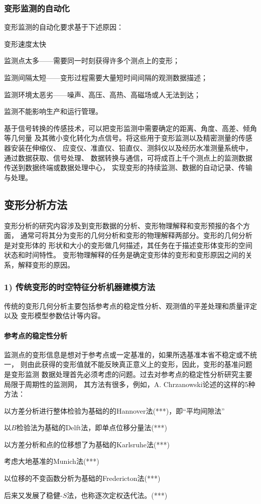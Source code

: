 \subsubsection*{变形监测的自动化}
变形监测的自动化要求基于下述原因：
\begin{asparaitem}[$\bullet$]
\item 变形速度太快
\item 监测点太多——需要同一时刻获得许多个测点上的变形；
\item 监测间隔太短——变形过程需要大量短时间间隔的观测数据描述；
\item 监测环境太恶劣——噪声、高压、高热、高磁场或人无法到达；
\item 监测不能影响生产和运行管理。
\end{asparaitem}
基于信号转换的传感技术，可以把变形监测中需要确定的距离、角度、高差、倾角等几何量
及其微小变化转化为点信号。将这些用于变形监测以及精密测量的传感器安装在伸缩仪、
应变仪、准直仪、铅直仪、测斜仪以及经历水准测量系统中，通过数据获取、信号处理、
数据转换与通信，可将成百上千个测点上的监测数据传送到数据终端或数据处理中心，
实现变形的持续监测、数据的自动记录、传输与处理。

\subsection{变形分析方法}
变形分析的研究内容涉及到变形数据的分析、变形物理解释和变形预报的各个方面，
通常可将其分为变形的几何分析和变形的物理解释两部分。变形的几何分析是对变形体的
形状和大小的变形做几何描述，其任务在于描述变形体变形的空间状态和时间特性。
变形物理解释的任务是确定变形体的变形和变形原因之间的关系，解释变形的原因。

\subsubsection*{1) 传统变形的时空特征分析机器建模方法}
传统的变形几何分析主要包括参考点的稳定性分析、观测值的平差处理和质量评定以及
变形模型参数估计等内容。
\paragraph*{参考点的稳定性分析} 
监测点的变形信息是想对于参考点或一定基准的，如果所选基准本省不稳定或不统一，
则由此获得的变形值就不能反映真正意义上的变形，因此，变形的基准问题是变形监测
数据处理首先必须考虑的问题。过去对参考点的稳定性分析研究主要局限于周期性的监测网，
其方法有很多，例如，A. Chrzanowski论述的这样的5种方法：
\begin{asparaitem}[$\bullet$]
\item 以方差分析进行整体检验为基础的的Hannover法(***)，即“平均间隙法”
\item 以$B$检验法为基础的Delft法，即单点位移分量法(***)
\item 以方差分析和点的位移想了为基础的Karlsruhe法(***)
\item 考虑大地基准的Munich法(***)
\item 以位移的不变函数分析为基础的Fredericton法(***)
\end{asparaitem}
后来又发展了稳健-$S$法，也称逐次定权迭代法。(***)
